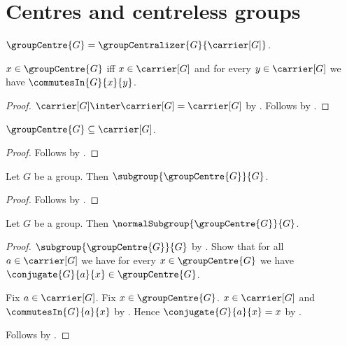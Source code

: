 

\section{Centres and centreless groups}

\begin{definition}\label{group_centre}
    $\groupCentre{G}=\groupCentralizer{G}{\carrier[G]}$.
\end{definition}

\begin{proposition}\label{group_centre_iff}
    $x\in\groupCentre{G}$ iff
        $x\in\carrier[G]$ and
        for every $y\in\carrier[G]$ we have
            $\commutesIn{G}{x}{y}$.
\end{proposition}
\begin{proof}
    $\carrier[G]\inter\carrier[G]=\carrier[G]$ by
        .
    Follows by .
\end{proof}

\begin{proposition}\label{group_centre_subseteq}
    $\groupCentre{G}\subseteq\carrier[G]$.
\end{proposition}
\begin{proof}
    Follows by
        .
\end{proof}

\begin{theorem}\label{group_centre_subgroup}
    Let $G$ be a group.
    Then $\subgroup{\groupCentre{G}}{G}$.
\end{theorem}
\begin{proof}
    Follows by
        .
\end{proof}

\begin{theorem}\label{group_centre_normal_subgroup}
    Let $G$ be a group.
    Then $\normalSubgroup{\groupCentre{G}}{G}$.
\end{theorem}
\begin{proof}
    $\subgroup{\groupCentre{G}}{G}$ by
        .
    Show that for all $a\in\carrier[G]$ we have for every
        $x\in\groupCentre{G}$ we have
        $\conjugate{G}{a}{x}\in\groupCentre{G}$.
    \begin{subproof}
        Fix $a\in\carrier[G]$.
        Fix $x\in\groupCentre{G}$.
        $x\in\carrier[G]$ and $\commutesIn{G}{a}{x}$ by
            .
        Hence $\conjugate{G}{a}{x}=x$ by
            .
    \end{subproof}
    Follows by .
\end{proof}

